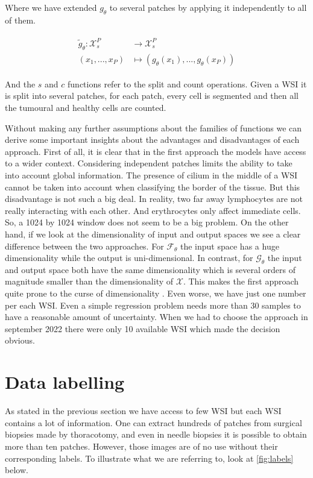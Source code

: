 Where we have extended $g_\theta$ to several patches by applying it independently to all of them.

\begin{align}
\begin{split}
\tilde{g}_\theta : \mathcal{X}_s^P& \to \mathcal{X}_s^P\\
(x_1, ..., x_P)& \mapsto (g_\theta(x_1), ..., g_\theta(x_P))
\end{split}
\end{align}

And the $s$ and $c$ functions refer to the split and count operations. Given a WSI it is split into several patches, for each patch, every cell is segmented and then all the tumoural and healthy cells are counted.

Without making any further assumptions about the families of functions we can derive some important insights about the advantages and disadvantages of each approach. First of all, it is clear that in the first approach the models have access to a wider context. Considering independent patches limits the ability to take into account global information. The presence of cilium in the middle of a WSI cannot be taken into account when classifying the border of the tissue. But this disadvantage is not such a big deal. In reality, two far away lymphocytes are not really interacting with each other. And erythrocytes only affect immediate cells. So, a 1024 by 1024 window does not seem to be a big problem. On the other hand, if we look at the dimensionality of input and output spaces we see a clear difference between the two approaches. For $\mathcal{F}_\theta$ the input space has a huge dimensionality while the output is uni-dimensional. In contrast, for $\mathcal{G}_\theta$ the input and output space both have the same dimensionality which is several orders of magnitude smaller than the dimensionality of $\mathcal{X}$. This makes the first approach quite prone to the curse of dimensionality \cite{AnalyticsVidhya}. Even worse, we have just one number per each WSI. Even a simple regression problem needs more than 30 samples to have a reasonable amount of uncertainty. When we had to choose the approach in september 2022 there were only 10 available WSI which made the decision obvious.

\section{Data labelling}\label{sec:data}

As stated in the previous section we have access to few WSI but each WSI contains a lot of information. One can extract hundreds of patches from surgical biopsies made by thoracotomy, and even in needle biopsies it is possible to obtain more than ten patches. However, those images are of no use without their corresponding labels. To illustrate what we are referring to, look at \autoref{fig:labels} below.

